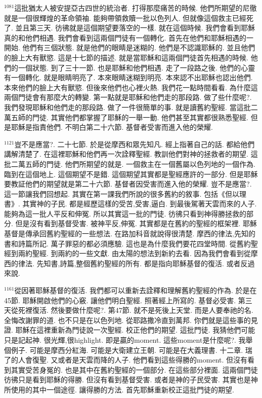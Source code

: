 \documentclass{book}
\begin{document}
$^{1081}$這批猶太人被安提亞古四世的統治者.
打得那麼痛苦的時候.
他們所期望的尼徹就是一個很輝煌的革命領袖.
能夠帶領救贖一批以色列人.
但就像這個救主已經死了.
並且第三天.
彷彿就是這個期望要落空的一樣.
就在這個時候.
我們會看到耶穌真的和他們相遇.
我們會看到這兩個門徒有一個轉化.
首先在他們和耶穌相遇的一開始.
他們有三個狀態.
就是他們的眼睛是迷糊的.
他們是不認識耶穌的.
並且他們的臉上大有獸慾.
這是十七節的描述.
就是當耶穌和這兩個門徒首先相遇的時候.
他們的一個狀態.
到了三十一節.
也是耶穌和他們相遇.
走了一段路之後.
他們的心靈有一個轉化.
就是眼睛明亮了.
本來眼睛迷糊到明亮.
本來認不出耶穌也認出他們.
本來他們的臉上大有獸慾.
但後來他們也心裡火熱.
我們花一點時間看看.
為什麼這兩個門徒會有那麼大的轉變.
第一點就是耶穌和他們走的那段路.
做了些什麼呢?.
我們發現耶穌和他們走的那段路.
做了一件很簡單的事.
就是讀舊約聖經.
當這批二萬五師的門徒.
其實他們都掌握了耶穌的一舉一動.
他們甚至其實都很熟悉聖經.
但是耶穌是指責他們.
不明白第二十六節.
基督者受害而進入他的榮耀.

$^{1121}$豈不是應當?.
二十七節.
於是從摩西和眾先知凡.
經上指著自己的話.
都給他們講解清楚了.
在這裡耶穌和他們再一次詮釋聖經.
教訓他們對神的拯救者的期望.
這批二萬五師的門徒.
他們所期望的就是.
一個救主在一個舊屬以色列地的一個作為.
臨到在這個地上.
這個期望不是錯.
這個期望其實都是聖經應許的一部分.
但是耶穌要教証他們的期望就是第二十六節.
基督者因受害而進入他的榮耀.
豈不是應當?.
這一節讓我們回想起.
其實在第一課我們所說的很多舊約的敘事.
包括《但以理書》.
其實神的子民.
都是經歷這樣的受苦,受害,逼白.
到最後駕著天雲而來的人子.
能夠為這一批人平反和伸冤.
所以其實這一批的門徒.
彷彿只看到神得勝拯救的部分.
但是沒有看到基督受害.
被神平反,伸冤.
其實都是在舊約的聖經的框架裡.
耶穌基督是傳承回舊約聖經的一些想法.
在路加科音就說得很清楚.
摩西的律法,先知的書和詩篇所記.
萬子罪惡的都必須應驗.
這也是為什麼我們要花四堂時間.
從舊約聖經到兩約聖經.
到兩約的一些文獻.
由太陽的想法到新約去看.
因為我們會看到從摩西的律法.
先知書,詩篇,整個舊約聖經的所有.
都是指向耶穌基督的復活.
或者反過來說.

$^{1161}$從因著耶穌基督的復活.
我們都可以重新去詮釋和理解舊約聖經的作為.
於是在45節.
耶穌開啟他們的心竅.
讓他們明白聖經.
照著經上所寫的.
基督必受害.
第三天從死裡復活.
然後要做什麼呢?.
第47節.
就不是死後上天堂.
而是人要奉祂的名.
全悔改謝罪的道.
也不只是在以色列地.
從耶路撒冷直到萬邦.
你們就是這些事的見證.
耶穌在這裡重新為門徒說一次聖經.
校正他們的期望.
這批門徒.
我猜他們可能只是記起神.
很光輝,很highlight.
即是贏的moment.
這些moment是什麼呢?.
我舉個例子.
可能是摩西分紅海.
可能是大衛建立王朝.
可能是在大義理書.
十二章.
瑞了的人會復聖.
又或者是天雲而降的人子.
他們看到這些得勝的moment.
但沒有看到其實受苦身冤的.
也是其中在舊約聖經的一個部分.
在這些部分裡面.
這兩個門徒彷彿只是看到耶穌的得勝.
但沒有看到基督受害.
或者是神的子民受害.
其實也是神所使用的其中一個途徑.
讓得勝的方法.
首先耶穌重新校正這批門徒的期望.
\end{document}
